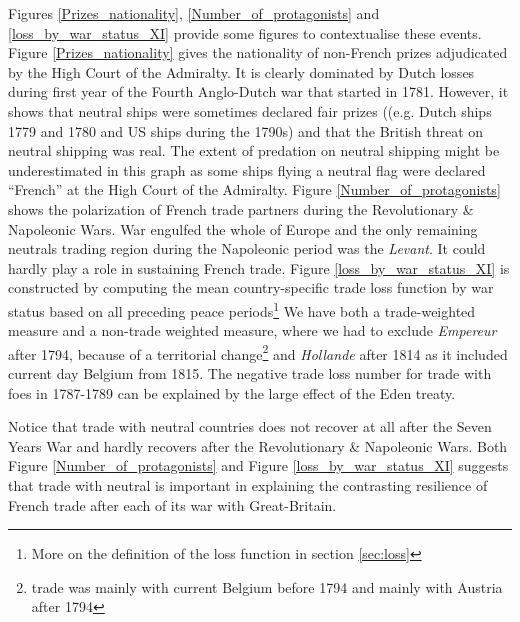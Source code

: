 \documentclass[12pt,a4paper,notitlepage,english]{article}
\begin{document}
Figures \ref{Prizes_nationality}, \ref{Number_of_protagonists} and \ref{loss_by_war_status_XI} provide some figures to contextualise these events. 
Figure \ref{Prizes_nationality} gives the nationality of non-French prizes adjudicated by the High Court of the Admiralty.
It is clearly dominated by Dutch losses during first year of the Fourth Anglo-Dutch war that started in 1781. However, it shows that neutral ships were sometimes declared fair prizes ((e.g. Dutch ships 1779 and 1780 and US ships during the 1790s) and that the British threat on neutral shipping was real. The extent of predation on neutral shipping might be underestimated in this graph as some ships flying a neutral flag were declared ``French'' at the High Court of the Admiralty.
Figure \ref{Number_of_protagonists} shows the polarization of French trade partners during the Revolutionary \& Napoleonic Wars. War engulfed the whole of Europe and the only remaining neutrals trading region during the Napoleonic period was the \textit{Levant}. It could hardly play a role in sustaining French trade.
Figure \ref{loss_by_war_status_XI} is constructed by computing the mean country-specific trade loss function by war status based on all preceding peace periods\footnote{More on the definition of the loss function in section \ref{sec:loss}}
We have both a trade-weighted measure and a non-trade weighted measure, where we had to exclude \textit{Empereur} after 1794, because of a territorial change\footnote{trade was mainly with current Belgium before 1794 and mainly with Austria after 1794} and \textit{Hollande} after 1814 as it included current day Belgium from 1815.
The negative trade loss number for trade with foes in 1787-1789 can be explained by the large effect of the Eden treaty.

Notice that trade with neutral countries does not recover at all after the Seven Years War and hardly recovers after the Revolutionary \& Napoleonic Wars. 
Both  Figure \ref{Number_of_protagonists} and Figure \ref{loss_by_war_status_XI} suggests that trade with neutral is important in explaining the contrasting resilience of French trade after each of its war with Great-Britain.


\end{document}
